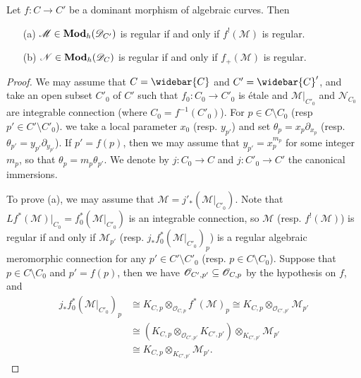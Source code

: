 \begin{proposition}\label{D-module holonomic on curve regular and functor}
Let $f:C\to C'$ be a dominant morphism of algebraic curves. Then
\begin{enumerate}
    \item[(a)] $\mathscr{M}\in\mathbf{Mod}_h(\mathscr{D}_{C'})$ is regular if and only if $f^!(\mathscr{M})$ is regular.
    \item[(b)] $\mathscr{N}\in\mathbf{Mod}_h(\mathscr{D}_{C})$ is regular if and only if $f_+(\mathscr{M})$ is regular. 
\end{enumerate}
\end{proposition}
\begin{proof}
We may assume that $C=\widebar{C}$ and $C'=\widebar{C}'$, and take an open subset $C'_0$ of $C'$ such that $f_0:C_0\to C'_0$ is \'etale and $\mathscr{M}|_{C'_0}$ and $\mathscr{N}_{C_0}$ are integrable connection (where $C_0=f^{-1}(C'_0)$). For $p\in C\setminus C_0$ (resp $p'\in C'\setminus C'_0$). we take a local parameter $x_0$ (resp. $y_{p'}$) and set $\theta_p=x_p\partial_{x_p}$ (resp. $\theta_{p'}=y_{p'}\partial_{y_{p'}}$). If $p'=f(p)$, then we may assume that $y_{p'}=x_p^{m_p}$ for some integer $m_p$, so that $\theta_p=m_p\theta_{p'}$. We denote by $j:C_0\to C$ and $j:C'_0\to C'$ the canonical immersions.\par
To prove (a), we may assume that $\mathscr{M}=j'_*(\mathscr{M}|_{C'_0})$. Note that $Lf^*(\mathscr{M})|_{C_0}=f_0^*(\mathscr{M}|_{C'_0})$ is an integrable connection, so $\mathscr{M}$ (resp. $f^!(\mathscr{M})$) is regular if and only if $\mathscr{M}_{p'}$ (resp. $j_*f_0^*(\mathscr{M}|_{C'_0})_p$) is a regular algebraic meromorphic connection for any $p'\in C'\setminus C'_0$ (resp. $p\in C\setminus C_0$). Suppose that $p\in C\setminus C_0$ and $p'=f(p)$, then we have $\mathscr{O}_{C',p'}\subseteq\mathscr{O}_{C,p}$ by the hypothesis on $f$, and
\begin{align*}
j_*f_0^*(\mathscr{M}|_{C'_0})_p&\cong K_{C,p}\otimes_{\mathscr{O}_{C,p}}f^*(\mathscr{M})_p\cong K_{C,p}\otimes_{\mathscr{O}_{C',p'}}\mathscr{M}_{p'}\\
&\cong (K_{C,p}\otimes_{\mathscr{O}_{C',p'}}K_{C',p'})\otimes_{K_{C',p'}}\mathscr{M}_{p'}\\
&\cong K_{C,p}\otimes_{K_{C',p'}}\mathscr{M}_{p'}.
\end{align*}

\end{proof}
